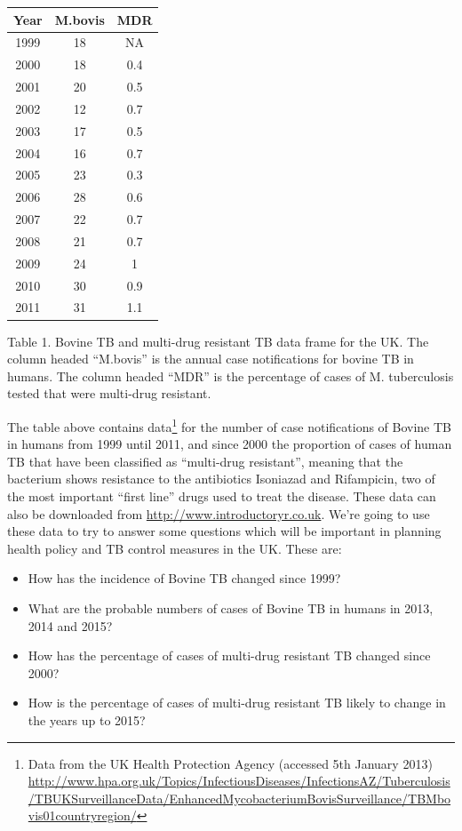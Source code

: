 \documentclass[
]{book}
\providecommand{\tightlist}{%
  \setlength{\itemsep}{0pt}\setlength{\parskip}{0pt}}
\begin{document}
\begin{longtable}[]{@{}ccc@{}}
\toprule
Year & M.bovis & MDR\tabularnewline
\midrule
\endhead
1999 & 18 & NA\tabularnewline
2000 & 18 & 0.4\tabularnewline
2001 & 20 & 0.5\tabularnewline
2002 & 12 & 0.7\tabularnewline
2003 & 17 & 0.5\tabularnewline
2004 & 16 & 0.7\tabularnewline
2005 & 23 & 0.3\tabularnewline
2006 & 28 & 0.6\tabularnewline
2007 & 22 & 0.7\tabularnewline
2008 & 21 & 0.7\tabularnewline
2009 & 24 & 1\tabularnewline
2010 & 30 & 0.9\tabularnewline
2011 & 31 & 1.1\tabularnewline
\bottomrule
\end{longtable}

Table 1. Bovine TB and multi-drug resistant TB data frame for the UK. The column headed ``M.bovis'' is the annual case notifications for bovine TB in humans. The column headed ``MDR'' is the percentage of cases of M. tuberculosis tested that were multi-drug resistant.

The table above contains data\footnote{Data from the UK Health Protection Agency (accessed 5th January 2013) \url{http://www.hpa.org.uk/Topics/InfectiousDiseases/InfectionsAZ/Tuberculosis/TBUKSurveillanceData/EnhancedMycobacteriumBovisSurveillance/TBMbovis01countryregion/}} for the number of case notifications of Bovine TB in humans from 1999 until 2011, and since 2000 the proportion of cases of human TB that have been classified as ``multi-drug resistant'', meaning that the bacterium shows resistance to the antibiotics Isoniazad and Rifampicin, two of the most important ``first line'' drugs used to treat the disease. These data can also be downloaded from \url{http://www.introductoryr.co.uk}. We're going to use these data to try to answer some questions which will be important in planning health policy and TB control measures in the UK. These are:

\begin{itemize}
\tightlist
\item
  How has the incidence of Bovine TB changed since 1999?
\item
  What are the probable numbers of cases of Bovine TB in humans in 2013, 2014 and 2015?
\item
  How has the percentage of cases of multi-drug resistant TB changed since 2000?
\item
  How is the percentage of cases of multi-drug resistant TB likely to change in the years up to 2015?
\end{itemize}
\end{document}
